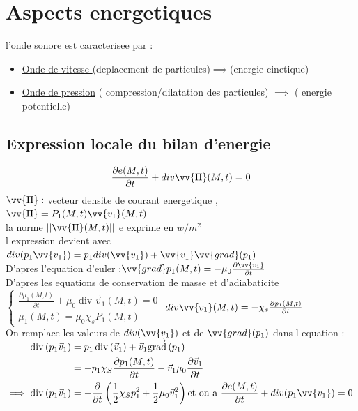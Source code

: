 \documentclass[12pt]{book}
\newcommand{\x}{\chi}
\begin{document}
        \section{Aspects energetiques}
            l'onde sonore est caracterisee par : \\
                \begin{itemize}
                    \item \underline{Onde de vitesse } (deplacement de particules)$ \implies $(energie cinetique) 
                    \item \underline{Onde de pression} ( compression/dilatation des particules) $\implies$ ( energie potentielle)    
                \end{itemize}
            \subsection{Expression locale du bilan d'energie}
                $$ \frac{\partial e(M,t)}{\partial t} + div\vv{\Pi}(M,t) = 0  $$ 
                $\vv{\Pi} :$ vecteur densite de courant energetique , $\vv{\Pi} = P_1(M,t)\vv{v_1}(M,t)$ \\
                la norme  $|| \vv{\Pi}(M,t) || $ e exprime en $w/m^2$ \\
                l expression devient  avec $div(p_1\vv{v_1})=p_1div(\vv{v_1})+\vv{v_1}\vv{grad}(p_1)$ \\
                D'apres l'equation d'euler :$\vv{grad}p_1(M,t)=-\mu_0\frac{\partial \vv{v_1}}{\partial t}$ \\
                D'apres les equations de conservation de masse et d'adiabaticite $\begin{cases}
                    \frac{\partial \mu_{1}(M, t)}{\partial t}+\mu_{0} \operatorname{div} \vec{v}_{1}(M, t)=0 \\
                    \mu_1(M,t) = \mu_0\x_sP_1(M,t)
                \end{cases}$
                $div\vv{v_1}(M,t)=-\x_s\frac{\partial p_1(M,t)}{\partial t}$ \\
                On remplace les valeurs de $div(\vv{v_1})$ et de $\vv{grad}(p_1)$ dans l equation :\\
                $\begin{aligned}
                    \operatorname{div}\left(p_{1} \vec{v}_{1}\right) &=p_{1} \operatorname{div}\left(\vec{v}_{1}\right)+\vec{v}_{1} \overrightarrow{\operatorname{grad}}\left(p_{1}\right) \\
                    &=-p_{1} \chi_{S} \frac{\partial p_{1}(M, t)}{\partial t}-\vec{v}_{1} \mu_{0} \frac{\partial \vec{v}_{1}}{\partial t}     \\
                    \implies\operatorname{div}\left(p_{1} \vec{v}_{1}\right)&=-\frac{\partial}{\partial t}\left(\frac{1}{2} \chi_{S} p_{1}^{2}+\frac{1}{2} \mu_{0} \vec{v}_{1}^{2}\right) \text{et on a }\frac{\partial e(M,t)}{\partial t} + div(p_1\vv{v_1}) = 0         
                \end{aligned}$\\
\end{document}
